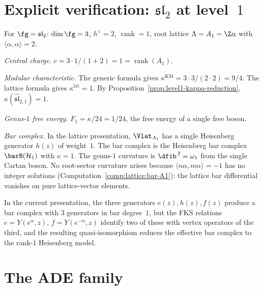 
\section{Explicit verification: \texorpdfstring{$\mathfrak{sl}_2$}{sl2}
at level~$1$}%
\label{sec:level1-sl2}

For $\fg = \mathfrak{sl}_2$: $\dim\fg = 3$, $h^\vee = 2$,
$\operatorname{rank} = 1$, root lattice $\Lambda = A_1 = \Z\alpha$ with
$\langle\alpha,\alpha\rangle = 2$.

\emph{Central charge.}
$c = 3 \cdot 1/(1+2) = 1 = \operatorname{rank}(A_1)$.

\emph{Modular characteristic.}
The generic formula gives
$\kappa^{\mathrm{KM}} = 3 \cdot 3/(2 \cdot 2) = 9/4$. The lattice
formula gives $\kappa^{\mathrm{lat}} = 1$. By
Proposition~\ref{prop:level1-kappa-reduction},
$\kappa(\widehat{\mathfrak{sl}}_{2,1}) = 1$.

\emph{Genus-$1$ free energy.}
$F_1 = \kappa/24 = 1/24$, the free energy of a single free boson.

\emph{Bar complex.}
In the lattice presentation, $\Vlat_{A_1}$ has a single Heisenberg
generator $h(z)$ of weight~$1$. The bar complex is the Heisenberg bar
complex $\barB(\mathcal{H}_1)$ with $\kappa = 1$. The genus-$1$
curvature is $\dfib^{\,2} = \omega_1$ from the single Cartan boson.
No root-sector curvature arises because
$\langle n\alpha, m\alpha \rangle = -1$ has no integer solutions
(Computation~\ref{comp:lattice:bar-A1}): the lattice bar differential
vanishes on pure lattice-vector elements.

In the current presentation, the three generators
$e(z), h(z), f(z)$ produce a bar complex with
$3$ generators in bar degree~$1$, but the FKS relations
$e = Y(e^\alpha, z)$, $f = Y(e^{-\alpha}, z)$ identify
two of these with vertex operators of the third, and the
resulting quasi-isomorphism reduces the effective bar
complex to the rank-$1$ Heisenberg model.



\section{The ADE family}%
\label{sec:level1-ade}

